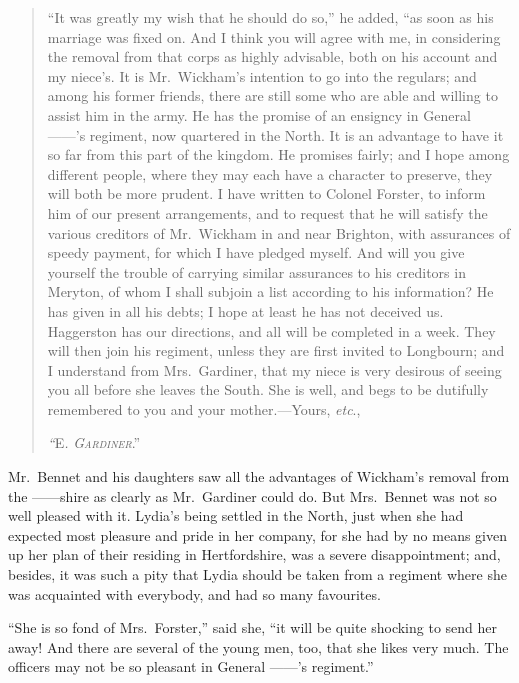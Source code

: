 \documentclass[12pt,english]{book}
\newcommand{\noun}[1]{\textsc{#1}}
\begin{document}
\begin{quotation}
{}``It was greatly my wish that he should do so,'' he added, {}``as
soon as his marriage was fixed on. And I think you will agree with
me, in considering the removal from that corps as highly advisable,
both on his account and my niece's. It is Mr.\ Wickham's intention
to go into the regulars; and among his former friends, there are still
some who are able and willing to assist him in the army. He has the
promise of an ensigncy in General \mbox{------}'s regiment, now quartered
in the North. It is an advantage to have it so far from this part
of the kingdom. He promises fairly; and I hope among different people,
where they may each have a character to preserve, they will both be
more prudent. I have written to Colonel Forster, to inform him of
our present arrangements, and to request that he will satisfy the
various creditors of Mr.\ Wickham in and near Brighton, with assurances
of speedy payment, for which I have pledged myself. And will you give
yourself the trouble of carrying similar assurances to his creditors
in Meryton, of whom I shall subjoin a list according to his information?
He has given in all his debts; I hope at least he has not deceived
us. Haggerston has our directions, and all will be completed in a
week. They will then join his regiment, unless they are first invited
to Longbourn; and I understand from Mrs.\ Gardiner, that my niece
is very desirous of seeing you all before she leaves the South. She
is well, and begs to be dutifully remembered to you and your mother.\mbox{---}Yours,
\textit{etc}.,

\emph{{}``}\noun{E}\emph{\noun{.}} \textit{\emph{\noun{Gardiner}}}.'' 
\end{quotation}
Mr.\ Bennet and his daughters saw all the advantages of Wickham's
removal from the \mbox{------shire} as clearly as Mr.\ Gardiner
could do. But Mrs.\ Bennet was not so well pleased with it. Lydia's
being settled in the North, just when she had expected most pleasure
and pride in her company, for she had by no means given up her plan
of their residing in Hertfordshire, was a severe disappointment; and,
besides, it was such a pity that Lydia should be taken from a regiment
where she was acquainted with everybody, and had so many favourites.

{}``She is so fond of Mrs.\ Forster,'' said she, {}``it will be
quite shocking to send her away! And there are several of the young
men, too, that she likes very much. The officers may not be so pleasant
in General \mbox{------}'s regiment.''
\end{document}
